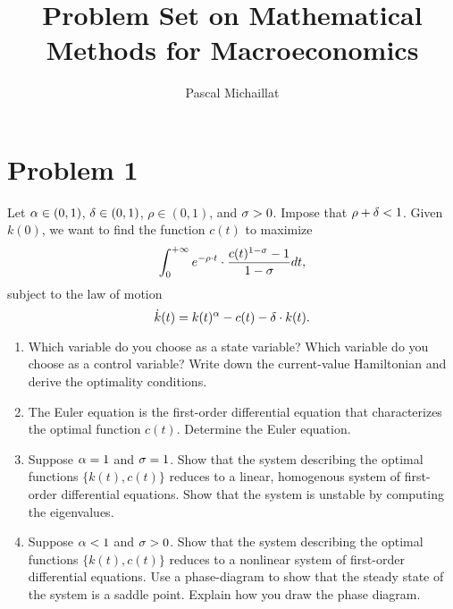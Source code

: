 \documentclass[letterpaper,12pt,leqno]{article}
\begin{document}
\title{Problem Set on Mathematical Methods for Macroeconomics}
\author{Pascal Michaillat}
\date{}

\begin{titlepage}
\maketitle
\end{titlepage}

\section*{Problem 1}

Let $\alpha \in (0,1)$, $\delta  \in (0,1)$, $\rho \in (0,1)$, and $\sigma>0$. Impose that $\rho+\delta<1$. Given $k(0)$, we want to find the function $c(t) $ to maximize 
\begin{equation*}
\int_{0}^{+\infty }e^{-\rho\cdot  t}\cdot \frac{c(t)^{1-\sigma}-1}{1-\sigma} dt,
\end{equation*}
subject to the law of motion
\begin{equation*}
\dot{k}(t) =k(t)^{\alpha}-c(t)-\delta \cdot k(t).
\end{equation*}

\begin{enumerate}

\item  Which variable do you choose as a state variable? Which variable do you choose as a control variable? Write down the current-value Hamiltonian and derive the optimality conditions.

\item The Euler equation is the first-order differential equation that characterizes the optimal function $c(t)$. Determine the Euler equation.

\item  Suppose $\alpha =1$ and $\sigma =1$. Show that the system describing the optimal functions $\{k(t),c(t)\}$ reduces to a linear, homogenous system of first-order differential equations. Show that the system is unstable by computing the eigenvalues. 

\item  Suppose $\alpha <1$ and $\sigma >0$. Show that the system describing the optimal functions $\{k(t),c(t)\}$ reduces to a nonlinear system of first-order differential equations. Use a phase-diagram to show that the steady state of the system is a saddle point. Explain how you draw the phase diagram.

\end{enumerate}
\end{document}
